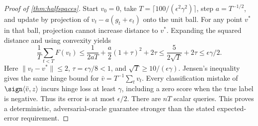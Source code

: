 \begin{proof}[Proof of \cref{thm:halfspaces}]
Start $v_0=0$, take $T=\lceil100/(\epsilon^2\gamma^2)\rceil$, step $a=T^{-1/2}$, and update by projection of $v_t-a(g_t+e_t)$ onto the unit ball. For any point $v^*$ in that ball, projection cannot increase distance to $v^*$. Expanding the squared distance and using convexity yields
\[
 \frac1T\sum_{t<T}F(v_t)
 \le\frac1{2aT}+\frac a2(1+\tau)^2+2\tau
 \le\frac{5}{2\sqrt T}+2\tau
 \le\epsilon\gamma/2.
\]
Here $\|v_t-v^*\|\le2$, $\tau=\epsilon\gamma/8<1$, and $\sqrt T\ge10/(\epsilon\gamma)$. Jensen's inequality gives the same hinge bound for $\bar v=T^{-1}\sum_t v_t$. Every classification mistake of $\sign\langle\bar v,z\rangle$ incurs hinge loss at least $\gamma$, including a zero score when the true label is negative. Thus its error is at most $\epsilon/2$. There are $nT$ scalar queries. This proves a deterministic, adversarial-oracle guarantee stronger than the stated expected-error requirement.
\end{proof}
